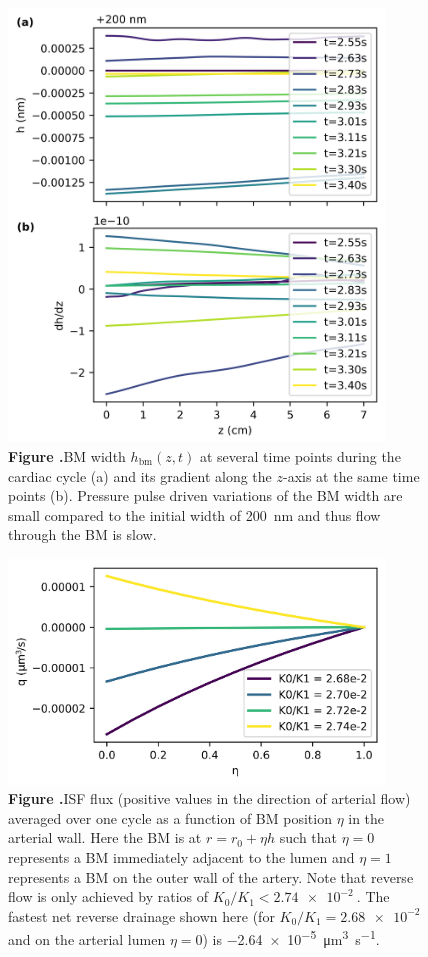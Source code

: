 \documentclass{frontiersFPHY} %
\begin{document}
\begin{figure}[h!]
\centering
\includegraphics[width=10cm]{figures/fig04.jpg}
\textbf{\label{fig:h} Figure .}{BM width $h_\textrm{bm}(z,t)$ at several time points during the cardiac cycle (a) and its gradient along the $z$-axis at the same time points (b). Pressure pulse driven variations of the BM width are small compared to the initial width of \SI{200}{\nano\metre} and thus flow through the BM is slow.}
\end{figure}

\begin{figure}[h!]
\centering
\includegraphics[width=10cm]{figures/fig05.jpg}
\textbf{\label{fig:valve_test} Figure .}{ISF flux (positive values in the direction of arterial flow) averaged over one cycle as a function of BM position $\eta$ in the arterial wall. Here the BM is at $r = r_0 + \eta h$ such that $\eta = 0$ represents a BM immediately adjacent to the lumen and $\eta = 1$ represents a BM on the outer wall of the artery. Note that reverse flow is only achieved by ratios of $K_0/K_1 < \SI{2.74e-2}{}$. The fastest net reverse drainage shown here (for $K_0/K_1 = \SI{2.68e-2}{}$ and on the arterial lumen $\eta = 0$) is \SI{-2.64e-5}{\cubic\micro\metre\per\second}.}
\end{figure}
\end{document}
